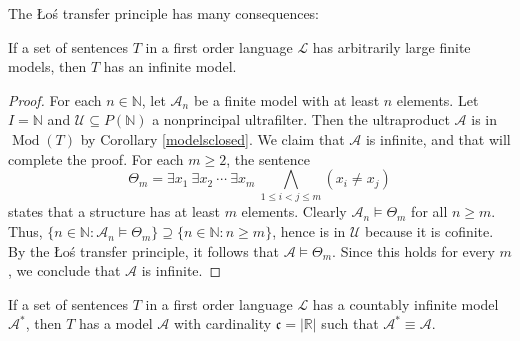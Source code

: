 \documentclass{article}
\def\A{\mathcal A}
\def\Lang{\mathcal L}
\def\U{\mathscr U}
\def\N{\mathbb N}
\def\R{\mathbb R}
\def\cont{\mathfrak c}
\def\Mod{\operatorname{Mod}}
\begin{document}
The \L o\'s transfer principle has many consequences:
\begin{proposition}\label{arblargefinites}
If a set of sentences $T$ in a first order language $\Lang$ has arbitrarily large finite models, then $T$ has an infinite model.
\end{proposition}
\begin{proof}
For each $n\in\N$, let $\A_n$ be a finite model with at least $n$ elements.  Let $I=\N$ and $\U\subseteq P(\N)$ a nonprincipal ultrafilter.  Then the ultraproduct $\A$ is in $\Mod(T)$ by Corollary \ref{modelsclosed}.  We claim that $\A$ is infinite, and that will complete the proof.  For each $m\ge 2$, the sentence
$$\Theta_m=\exists x_1~\exists x_2~\cdots~\exists x_m~\bigwedge_{1\le i<j\le m}(x_i\ne x_j)$$
states that a structure has at least $m$ elements.  Clearly $\A_n\models\Theta_m$ for all $n\ge m$.  Thus, $\{n\in\N:\A_n\models\Theta_m\}\supseteq\{n\in\N:n\ge m\}$, hence is in $\U$ because it is cofinite.  By the \L o\'s transfer principle, it follows that $\A\models\Theta_m$.  Since this holds for every $m$, we conclude that $\A$ is infinite.
\end{proof}
\begin{proposition}\label{countabletocontinuum}
If a set of sentences $T$ in a first order language $\Lang$ has a countably infinite model $\A^*$, then $T$ has a model $\A$ with cardinality $\cont=|\R|$ such that $\A^*\equiv\A$.
\end{proposition}
\end{document}
